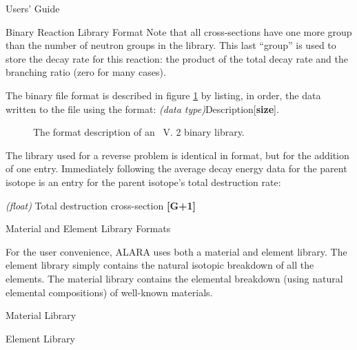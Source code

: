 \begin{chapter}{Users' Guide\label{app:user.guide}}
\begin{section}{Binary Reaction Library Format}
    Note that all cross-sections have one more group than the number
    of neutron groups in the library.  This last ``group'' is used to
    store the decay rate for this reaction: the product of the total
    decay rate and the branching ratio (zero for many cases).
    
    The binary file format is described in figure
    \ref{fig:binary_format} by listing, in order, the data written to
    the file using the format: \textsl{(data
      type)}Description[\textbf{size}].

    \begin{figure}[htbp]
      \begin{center}
      \caption{The format description of an \ALARA\ V. 2 binary library.}
      \label{fig:binary_format}
      \end{center}
    \end{figure}

    The library used for a reverse problem is identical in format,
    but for the addition of one entry.  Immediately following the
    average decay energy data for the parent isotope is an entry for
    the parent isotope's total destruction rate:
    \begin{center}
      \textsl{(float)} Total destruction cross-section \textbf{[G+1]}
    \end{center}
  \end{section}

  
  \begin{section}{Material and Element Library Formats}\label{app:mat_el_libs}
    
    For the user convenience, ALARA uses both a material and element
    library.  The element library simply contains the natural isotopic
    breakdown of all the elements.  The material library contains the
    elemental breakdown (using natural elemental compositions) of
    well-known materials.
    
    \begin{subsection}{Material Library\label{app:user.matlib}}
      
      \begin{center}
      \end{center}

    \end{subsection}

    \begin{subsection}{Element Library\label{app:user.elelib}}
      

\end{subsection}
\end{section}
\end{chapter}
